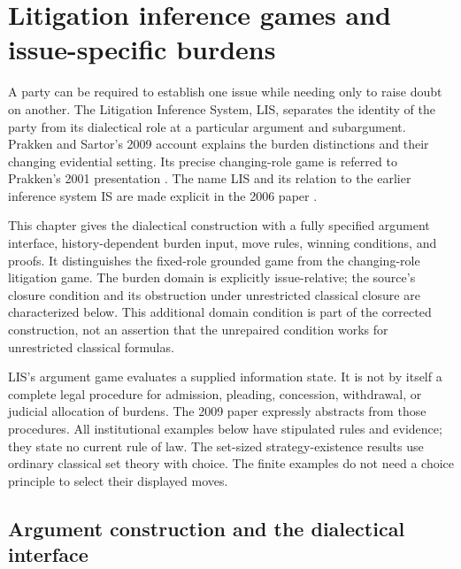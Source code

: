\chapter{Litigation inference games and issue-specific burdens}
\label{sec:p18-lis-burdens}

A party can be required to establish one issue while needing only to
raise doubt on another. The Litigation Inference System, LIS, separates
the identity of the party from its dialectical role at a particular
argument and subargument.
Prakken and Sartor's 2009 account \cite{PrakkenSartor2009Burdens}
explains the burden distinctions and their changing evidential setting.
Its precise changing-role game is referred to Prakken's 2001
presentation \cite{Prakken2001Defeasibility}.
The name LIS and its relation to the earlier inference system IS
are made explicit in the 2006 paper
\cite{PrakkenSartor2006Presumptions}.

This chapter gives the dialectical construction with a fully specified
argument interface, history-dependent burden input, move rules,
winning conditions, and proofs. It distinguishes the fixed-role
grounded game from the changing-role litigation game.
The burden domain is explicitly issue-relative; the source's
closure condition and its obstruction under unrestricted classical
closure are characterized below. This additional domain condition is part of the corrected
construction, not an assertion that the unrepaired condition works
for unrestricted classical formulas.

LIS's argument game evaluates a supplied information state. It is not
by itself a complete legal procedure for admission, pleading,
concession, withdrawal, or judicial allocation of burdens.
The 2009 paper expressly abstracts from those procedures.
All institutional examples below have stipulated rules and evidence;
they state no current rule of law.
The set-sized strategy-existence results use ordinary classical
set theory with choice. The finite examples do not need a choice
principle to select their displayed moves.

\section{Argument construction and the dialectical interface}
\label{sec:p18-lis-interface}

